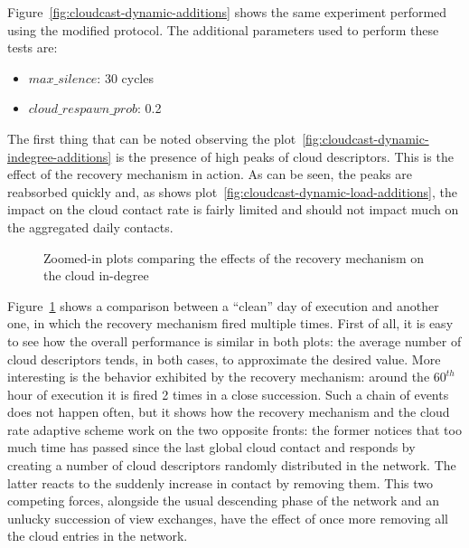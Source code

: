 Figure~\ref{fig:cloudcast-dynamic-additions} shows the same experiment
performed using the modified \cloudcast protocol. The additional
parameters used to perform these tests are:
\begin{itemize}
  \item $max\_silence$: 30 cycles
  \item $cloud\_respawn\_prob$: 0.2
\end{itemize}

The first thing that can be noted observing the
plot~\ref{fig:cloudcast-dynamic-indegree-additions} is the presence of
high peaks of cloud descriptors. This is the effect of the recovery
mechanism in action. As can be seen, the peaks are reabsorbed quickly
and, as shows plot~\ref{fig:cloudcast-dynamic-load-additions}, the
impact on the cloud contact rate is fairly limited and should not
impact much on the aggregated daily contacts.

\begin{figure}[h!]
  \centering
  \caption{Zoomed-in plots comparing the effects of the recovery
    mechanism on the cloud in-degree}
  \label{fig:cloudcast-dynamic-indegree-additions-detail}
\end{figure}


Figure~\ref{fig:cloudcast-dynamic-indegree-additions-detail} shows a
comparison between a ``clean'' day of execution and another one, in which the
recovery mechanism fired multiple times. First of all, it is easy to see
how the overall performance is similar in both plots: the average
number of cloud descriptors tends, in both cases, to approximate the
desired value.
More interesting is the behavior exhibited by the recovery mechanism:
around the $60^{th}$ hour of execution it is fired 2 times in a close
succession. Such a chain of events does not happen often, but it shows
how the recovery mechanism and the cloud rate adaptive scheme work
on the two opposite fronts: the former notices that too much time has
passed since the last global cloud contact and responds by creating a
number of cloud descriptors randomly distributed in the network. The
latter reacts to the suddenly increase in contact by removing
them.
This two competing forces, alongside the usual descending phase of the
network and an unlucky succession of view exchanges, have the effect
of once more removing all the cloud entries in the network.

